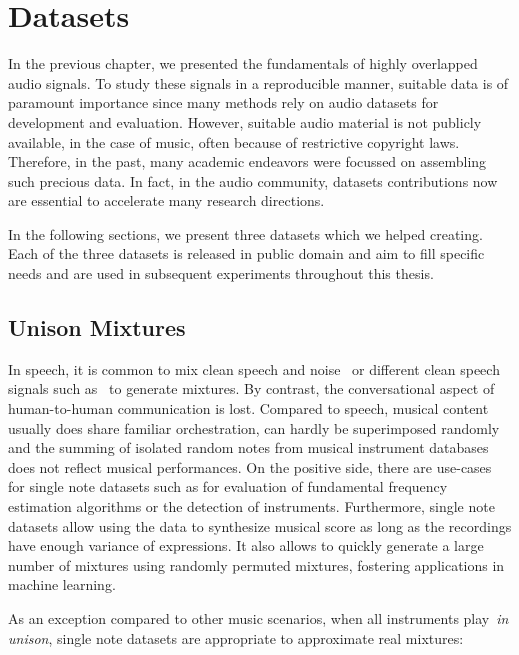 \chapter{Datasets}
\label{cha:datasets}

In the previous chapter, we presented the fundamentals of highly overlapped audio signals.
To study these signals in a reproducible manner, suitable data is of paramount importance since many methods rely on audio datasets for development and evaluation.
However, suitable audio material is not publicly available, in the case of music, often because of restrictive copyright laws. 
Therefore, in the past, many academic endeavors were focussed on assembling such precious data. 
In fact, in the audio community, datasets contributions now are essential to  accelerate many research directions.
\par
In the following sections, we present three datasets which we helped creating.
Each of the three datasets is released in public domain and aim to fill specific needs and are used in subsequent experiments throughout this thesis.

\section{Unison Mixtures}
\label{sec:unison_dataset}


In speech, it is common to mix clean speech and noise~\cite{varga93} or different clean speech signals such as~\cite{garofolo93} to generate mixtures.
By contrast, the conversational aspect of human-to-human communication is lost.
Compared to speech, musical content usually does share familiar orchestration, can hardly be superimposed randomly and the summing of isolated random notes from musical instrument databases does not reflect musical performances.
On the positive side, there are use-cases for single note datasets such as for evaluation of fundamental frequency estimation algorithms or the detection of instruments.
Furthermore, single note datasets allow using the data to synthesize musical score as long as the recordings have enough variance of expressions.
It also allows to quickly generate a large number of mixtures using randomly permuted mixtures, fostering applications in machine learning.

As an exception compared to other music scenarios, when all instruments play~\emph{in unison}, single note datasets are appropriate to approximate real mixtures:

